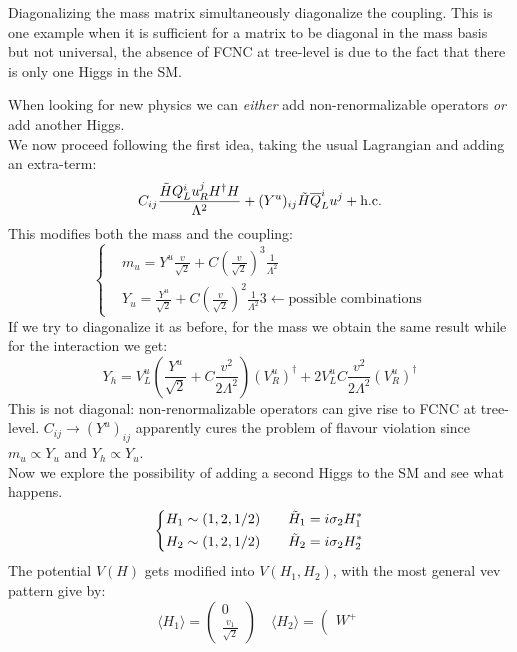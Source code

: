 \documentclass[../main.tex]{subfiles}
\begin{document}
Diagonalizing the mass matrix simultaneously diagonalize the coupling. This is one example when it is sufficient for a matrix to be diagonal in the mass basis but not universal, the absence of FCNC at tree-level is due to the fact that there is only one Higgs in the SM.
\begin{kaobox}[frametitle=Two Higgs doublet model]
When looking for new physics we can \textit{either} add non-renormalizable operators \textit{or} add another Higgs.\\
We now proceed following the first idea, taking the usual Lagrangian and adding an extra-term:
\[
C_{ij}\frac{\Tilde{H}Q_L^iu_R^jH^\dagger H}{\Lambda^2}+(Y^u)_{ij}\Tilde{H}\overline{Q}_L^iu^j+\text{h.c.}
\]
This modifies both the mass and the coupling:
\[
\left\{
\begin{aligned}
&m_u=Y^u\frac{v}{\sqrt{2}}+C\left(\frac{v}{\sqrt{2}}\right)^3\frac{1}{\Lambda^2}\\
&Y_u=\frac{Y^u}{\sqrt{2}}+C\left(\frac{v}{\sqrt{2}}\right)^2\frac{1}{\Lambda^2}3\xleftarrow[]{}\text{possible combinations}
\end{aligned}
\right.
\]
If we try to diagonalize it as before, for the mass we obtain the same result while for the interaction we get:
\[
Y_h=V_L^u\left(\frac{Y^u}{\sqrt{2}}+C\frac{v^2}{2\Lambda^2}\right)(V_R^u)^\dagger+2V_L^uC\frac{v^2}{2\Lambda^2}(V_R^u)^\dagger
\]
This is not diagonal: non-renormalizable operators can give rise to FCNC at tree-level. $C_{ij}\xrightarrow[]{}(Y^u)_{ij}$ apparently cures the problem of flavour violation since $m_u\propto Y_u$ and $Y_h\propto Y_u$.\\
Now we explore the possibility of adding a second Higgs to the SM and see what happens. 
\[
\left\{
\begin{aligned}
&H_1\sim(1,2,1/2) \quad &&\Tilde{H}_1=i\sigma_2H_1^*\\
&H_2\sim(1,2,1/2) \quad &&\Tilde{H}_2=i\sigma_2H_2^*
\end{aligned}
\right.
\]
The potential $V(H)$ gets modified into $V(H_1,H_2)$, with the most general vev pattern give by:
\[
\langle H_1 \rangle=\left(\begin{array}{c}
     0 \\
     \frac{v_1}{\sqrt{2}}
\end{array}\right)
\quad
\langle H_2 \rangle=\left(\begin{array}{c}
     W^+ \\

\end{array}\]
\end{kaobox}
\end{document}
